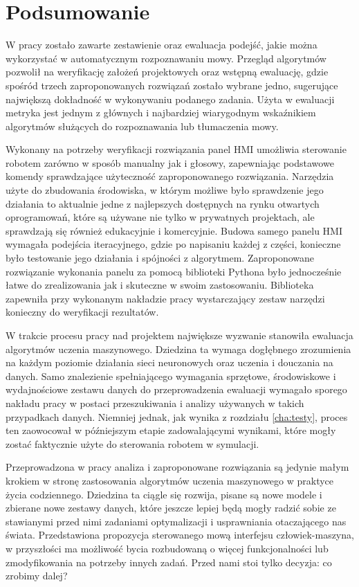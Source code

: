 \chapter{Podsumowanie}
\label{cha:podsumowanie}

W pracy zostało zawarte zestawienie oraz ewaluacja podejść, jakie można wykorzystać w automatycznym rozpoznawaniu mowy. Przegląd algorytmów pozwolił na weryfikację założeń projektowych oraz wstępną ewaluację, gdzie spośród trzech zaproponowanych rozwiązań zostało wybrane jedno, sugerujące największą dokładność w wykonywaniu podanego zadania. Użyta w ewaluacji metryka jest jednym z głównych i najbardziej wiarygodnym wskaźnikiem algorytmów służących do rozpoznawania lub tłumaczenia mowy.  

Wykonany na potrzeby weryfikacji rozwiązania panel HMI umożliwia sterowanie robotem zarówno w sposób manualny jak i głosowy, zapewniając podstawowe komendy sprawdzające użyteczność zaproponowanego rozwiązania. Narzędzia użyte do zbudowania środowiska, w którym możliwe było sprawdzenie jego działania to aktualnie jedne z najlepszych dostępnych na rynku otwartych oprogramowań, które są używane nie tylko w prywatnych projektach, ale sprawdzają się również edukacyjnie i komercyjnie. Budowa samego panelu HMI wymagała podejścia iteracyjnego, gdzie po napisaniu każdej z części, konieczne było testowanie jego działania i spójności z algorytmem. Zaproponowane rozwiązanie wykonania panelu za pomocą biblioteki Pythona było jednocześnie łatwe do zrealizowania jak i skuteczne w swoim zastosowaniu. Biblioteka zapewniła przy wykonanym nakładzie pracy wystarczający zestaw narzędzi konieczny do weryfikacji rezultatów.

W trakcie procesu pracy nad projektem największe wyzwanie stanowiła ewaluacja algorytmów uczenia maszynowego. Dziedzina ta wymaga dogłębnego zrozumienia na każdym poziomie działania sieci neuronowych oraz uczenia i douczania na danych. Samo znalezienie spełniającego wymagania sprzętowe, środowiskowe i wydajnościowe zestawu danych do przeprowadzenia ewaluacji wymagało sporego nakładu pracy w postaci przeszukiwania i analizy używanych w takich przypadkach danych. Niemniej jednak, jak wynika z rozdziału \ref{cha:testy}, proces ten zaowocował w późniejszym etapie zadowalającymi wynikami, które mogły zostać faktycznie użyte do sterowania robotem w symulacji. 

Przeprowadzona w pracy analiza i zaproponowane rozwiązania są jedynie małym krokiem w stronę zastosowania algorytmów uczenia maszynowego w praktyce życia codziennego. Dziedzina ta ciągle się rozwija, pisane są nowe modele i zbierane nowe zestawy danych, które jeszcze lepiej będą mogły radzić sobie ze stawianymi przed nimi zadaniami optymalizacji i usprawniania otaczającego nas świata. Przedstawiona propozycja sterowanego mową interfejsu człowiek-maszyna, w przyszłości ma możliwość bycia rozbudowaną o więcej funkcjonalności lub zmodyfikowania na potrzeby innych zadań. Przed nami stoi tylko decyzja: co zrobimy dalej?
